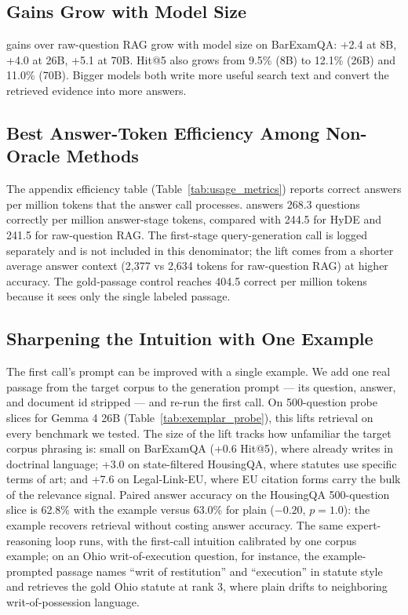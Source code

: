 \subsection{Gains Grow with Model Size}

\hyre{} gains over raw-question RAG grow with model size on BarExamQA: +2.4\pp{}
at 8B, +4.0\pp{} at 26B, +5.1\pp{} at 70B. Hit@5 also grows from 9.5\% (8B)
to 12.1\% (26B) and 11.0\% (70B). Bigger models both write more useful search
text and convert the retrieved evidence into more answers.

\subsection{Best Answer-Token Efficiency Among Non-Oracle Methods}

The appendix efficiency table (Table~\ref{tab:usage_metrics}) reports
correct answers per million tokens that the answer call processes. \hyre{}
answers 268.3 questions correctly per million answer-stage tokens, compared
with 244.5 for HyDE and 241.5 for raw-question RAG. The first-stage
query-generation call is logged separately and is not included in this
denominator; the lift comes from a shorter average answer context (2,377
vs 2,634 tokens for raw-question RAG) at higher accuracy. The gold-passage
control reaches 404.5 correct per million tokens because it sees only the
single labeled passage.

\subsection{Sharpening the Intuition with One Example}\label{subsec:housing_promising}

The first call's prompt can be improved with a single example. We add one
real passage from the target corpus to the \hyre{} generation prompt ---
its question, answer, and document id stripped --- and re-run the first
call. On 500-question probe slices for Gemma 4 26B
(Table~\ref{tab:exemplar_probe}), this lifts retrieval on every benchmark
we tested. The size of the lift tracks how unfamiliar the target corpus
phrasing is: small on BarExamQA (+0.6\pp{} Hit@5), where \hyre{} already
writes in doctrinal language; +3.0\pp{} on state-filtered HousingQA, where
statutes use specific terms of art; and +7.6\pp{} on Legal-Link-EU, where
EU citation forms carry the bulk of the relevance signal. Paired answer
accuracy on the HousingQA 500-question slice is 62.8\% with the example
versus 63.0\% for plain \hyre{} ($-0.20$\pp{}, $p=1.0$): the example
recovers retrieval without costing answer accuracy. The same expert-reasoning
loop runs, with the first-call intuition calibrated by one corpus example;
on an Ohio writ-of-execution question, for instance, the example-prompted
passage names ``writ of restitution'' and ``execution'' in statute style
and retrieves the gold Ohio statute at rank 3, where plain \hyre{} drifts
to neighboring writ-of-possession language.

